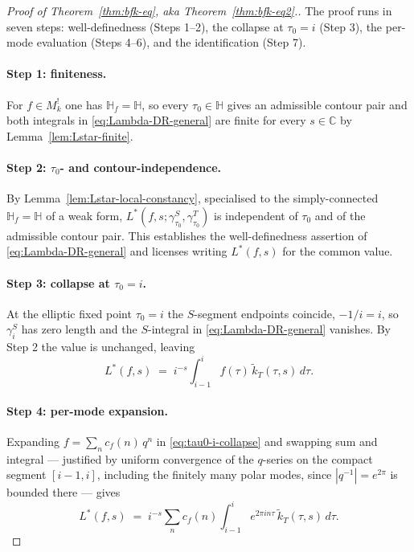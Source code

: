 \documentclass[11pt]{article}
\numberwithin{equation}{section}  %
\newcommand{\HH}{\mathbb{H}}
\newcommand{\CC}{\mathbb{C}}
\begin{document}
\begin{proof}[Proof of Theorem~\ref{thm:bfk-eq}, aka Theorem~\ref{thm:bfk-eq2}.]
The proof runs in seven steps: well-definedness (Steps 1--2), the
collapse at $\tau_0 = i$ (Step 3), the per-mode evaluation
(Steps 4--6), and the identification (Step 7).

\paragraph{Step 1: finiteness.}
For $f \in M^!_k$ one has $\HH_f = \HH$, so every $\tau_0 \in \HH$
gives an admissible contour pair and both integrals in
\eqref{eq:Lambda-DR-general} are finite for every
$s \in \CC$ by Lemma~\ref{lem:Lstar-finite}.

\paragraph{Step 2: $\tau_0$- and contour-independence.}
By Lemma~\ref{lem:Lstar-local-constancy}, specialised to the
simply-connected $\HH_f = \HH$ of a weak form,
$L^*(f, s; \gamma^S_{\tau_0}, \gamma^T_{\tau_0})$ is independent of
$\tau_0$ and of the admissible contour pair.  This establishes the
well-definedness assertion of \eqref{eq:Lambda-DR-general}
and licenses writing $L^*(f, s)$ for the common value.

\paragraph{Step 3: collapse at $\tau_0 = i$.}
At the elliptic fixed point $\tau_0 = i$ the $S$-segment endpoints
coincide, $-1/i = i$, so $\gamma^S_i$ has zero length and the
$S$-integral in \eqref{eq:Lambda-DR-general} vanishes.  By
Step 2 the value is unchanged, leaving
\begin{equation}\label{eq:tau0-i-collapse}
  L^*(f, s)
  \;=\; i^{-s}\!\int_{i - 1}^{i}\! f(\tau)\,\widetilde{k}_T(\tau, s)\,d\tau.
\end{equation}

\paragraph{Step 4: per-mode expansion.}
Expanding $f = \sum_n c_f(n)\,q^n$ in \eqref{eq:tau0-i-collapse} and
swapping sum and integral --- justified by uniform convergence of the
$q$-series on the compact segment $[i - 1, i]$, including the finitely
many polar modes, since $|q^{-1}| = e^{2\pi}$ is bounded there ---
gives
\begin{equation}\label{eq:per-mode-tau0-i}
  L^*(f, s)
  \;=\; i^{-s}\!\sum_n\! c_f(n)\!\int_{i - 1}^{i}\! e^{2\pi i n \tau}\,
  \widetilde{k}_T(\tau, s)\,d\tau.
\end{equation}


\end{proof}
\end{document}
